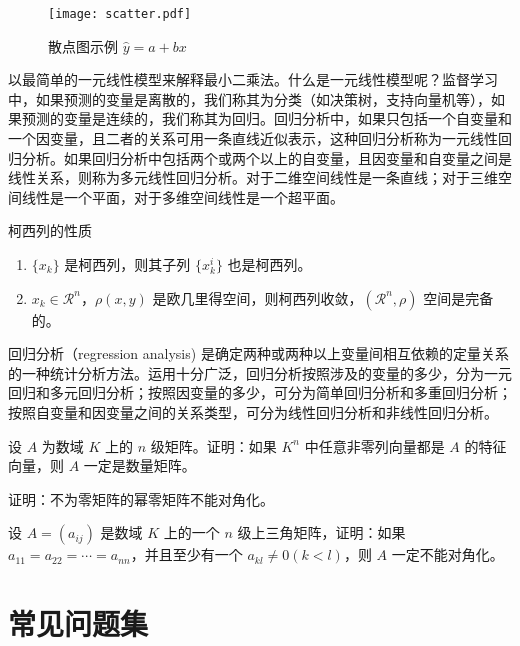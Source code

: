 \documentclass[cn,11pt]{elegantbook}
\begin{document}
\begin{figure}[htbp]
  \centering
  \texttt{[image: scatter.pdf]}
  \caption{散点图示例 $\hat{y}=a+bx$ \label{fig:scatter}}
\end{figure}

以最简单的一元线性模型来解释最小二乘法。什么是一元线性模型呢？监督学习中，如果预测的变量是离散的，我们称其为分类（如决策树，支持向量机等），如果预测的变量是连续的，我们称其为回归。回归分析中，如果只包括一个自变量和一个因变量，且二者的关系可用一条直线近似表示，这种回归分析称为一元线性回归分析。如果回归分析中包括两个或两个以上的自变量，且因变量和自变量之间是线性关系，则称为多元线性回归分析。对于二维空间线性是一条直线；对于三维空间线性是一个平面，对于多维空间线性是一个超平面。

\begin{property}\label{property:cauchy}
柯西列的性质
\begin{enumerate}
\item $\{x_k\}$ 是柯西列，则其子列 $\{x_k^i\}$ 也是柯西列。
\item $x_k\in \mathcal{R}^n$，$\rho(x,y)$ 是欧几里得空间，则柯西列收敛，$(\mathcal{R}^n,\rho)$ 空间是完备的。
\end{enumerate}
\end{property}

\begin{conclusion}
回归分析（regression analysis) 是确定两种或两种以上变量间相互依赖的定量关系的一种统计分析方法。运用十分广泛，回归分析按照涉及的变量的多少，分为一元回归和多元回归分析；按照因变量的多少，可分为简单回归分析和多重回归分析；按照自变量和因变量之间的关系类型，可分为线性回归分析和非线性回归分析。
\end{conclusion}

\begin{problemset}
\item 设 $A$ 为数域 $K$ 上的 $n$ 级矩阵。证明：如果 $K^n$ 中任意非零列向量都是 $A$ 的特征向量，则 $A$ 一定是数量矩阵。
\item 证明：不为零矩阵的幂零矩阵不能对角化。
\item 设 $A = (a_{ij})$ 是数域 $K$ 上的一个 $n$ 级上三角矩阵，证明：如果 $a_{11} = a_{22} = \cdots = a_{nn}$，并且至少有一个 $a_{kl} \not = 0 (k < l)$，则 $A$ 一定不能对角化。
\end{problemset}

\chapter{常见问题集}
\end{document}
